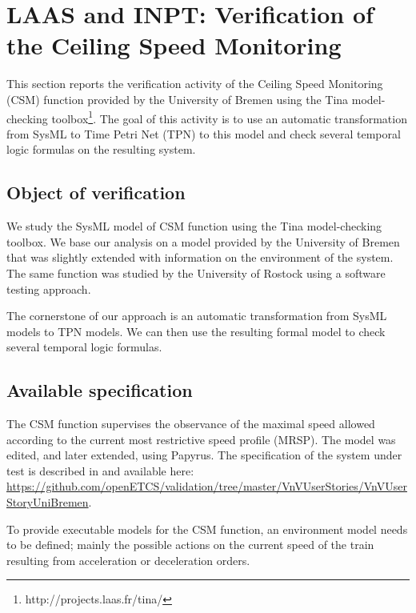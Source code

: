 \newcommand{\uml}{UML\xspace}
\newcommand{\marte}{MARTE\xspace}
\newcommand{\tpn}{TPN\xspace}
\newcommand{\sysml}{SysML\xspace}

\section{LAAS and INPT: Verification of the  Ceiling Speed Monitoring}

This section reports the verification activity of the Ceiling Speed Monitoring (CSM) function provided by the University of Bremen using the Tina model-checking toolbox\footnote{http://projects.laas.fr/tina/}. The goal of this activity is to use an automatic transformation from SysML to Time Petri Net (TPN) to this model and check several temporal logic formulas on the resulting system.  

\subsection{Object of verification}

We study the SysML model of CSM function using the Tina model-checking toolbox. 
We base our analysis on a model provided by the University of Bremen that was slightly
extended with information on the environment of the system. The same
function was studied by the University of Rostock using a software
testing approach.

The cornerstone of our approach is an automatic transformation from
SysML models to TPN models. We can then use the resulting formal
model to check several temporal logic formulas.

\subsection{Available specification}

The CSM function supervises the observance of the maximal speed allowed according to the current most restrictive speed profile (MRSP). The model was edited, and later extended, using Papyrus. 
The specification of the system under test is described in \cite{csmwp4} and available here: \url{https://github.com/openETCS/validation/tree/master/VnVUserStories/VnVUserStoryUniBremen}.  

To provide executable models for the CSM function, an environment model needs to be defined; mainly the possible actions on the current speed of the train resulting from 
acceleration or deceleration orders. 

